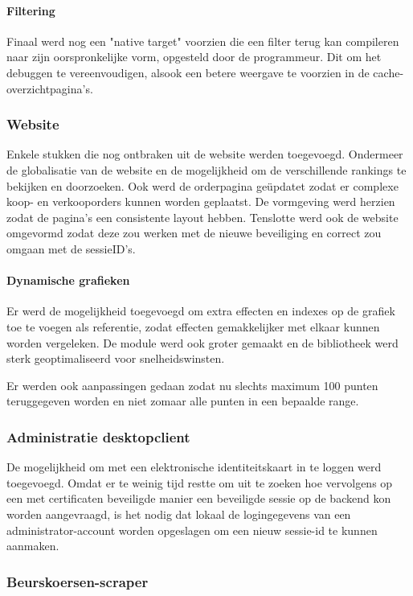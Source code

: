 \paragraph{Filtering}
Finaal werd nog een "native target" voorzien die een filter terug kan compileren naar zijn oorspronkelijke vorm, opgesteld door de programmeur. Dit om het debuggen te vereenvoudigen, alsook een betere weergave te voorzien in de cache-overzichtpagina's.

\subsubsection{Website}
Enkele stukken die nog ontbraken uit de website werden toegevoegd. Ondermeer de globalisatie van de website en de mogelijkheid om de verschillende rankings te bekijken en doorzoeken. Ook werd de orderpagina ge\"updatet zodat er complexe koop- en verkooporders kunnen worden geplaatst. De vormgeving werd herzien zodat de pagina's een consistente layout hebben.
Tenslotte werd ook de website omgevormd zodat deze zou werken met de nieuwe beveiliging en correct zou omgaan met de sessieID's.

\paragraph{Dynamische grafieken}
Er werd de mogelijkheid toegevoegd om extra effecten en indexes op de grafiek toe te voegen als referentie, zodat effecten gemakkelijker met elkaar kunnen worden vergeleken. 
De module werd ook groter gemaakt en de bibliotheek werd sterk geoptimaliseerd voor snelheidswinsten.

Er werden ook aanpassingen gedaan zodat nu slechts maximum 100 punten teruggegeven worden en niet zomaar alle punten in een bepaalde range.

\subsubsection{Administratie desktopclient}
De mogelijkheid om met een elektronische identiteitskaart in te loggen werd toegevoegd. Omdat er te weinig tijd restte om uit te zoeken hoe vervolgens op een met certificaten beveiligde manier een beveiligde sessie op de backend kon worden aangevraagd, is het nodig dat lokaal de logingegevens van een administrator-account worden opgeslagen om een nieuw sessie-id te kunnen aanmaken.

\subsubsection{Beurskoersen-scraper}

